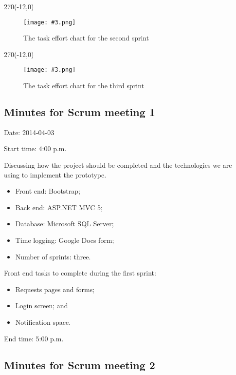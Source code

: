 \documentclass[a4paper,titlepage,12pt]{article}
\newcommand\figimg[4][\textwidth]{
	\begin{figure}
		\caption{#4}
		\label{fig:#2}
		\texttt{[image: \#3.png]}
	\end{figure}
}
\begin{document}
\begin{landscape}
	\quad %
	\thispagestyle{empty}
	\begin{textblock}{270}(-12,0)
		\figimg[270mm]{effort2}{effort2}
			{The task effort chart for the second sprint}
	\end{textblock}
\end{landscape}

\begin{landscape}
	\quad %
	\thispagestyle{empty}
	\begin{textblock}{270}(-12,0)
		\figimg[270mm]{effort3}{effort3}
			{The task effort chart for the third sprint}
	\end{textblock}
\end{landscape}

\subsection{Minutes for Scrum meeting 1}

Date: 2014-04-03

Start time: 4:00 p.m.

Discussing how the project should be completed and the technologies we are
using to implement the prototype.

\begin{itemize}
	\item Front end: Bootstrap;
	\item Back end: ASP.NET MVC 5;
	\item Database: Microsoft SQL Server;
	\item Time logging: Google Docs form;
	\item Number of sprints: three.
\end{itemize}

Front end tasks to complete during the first sprint:

\begin{itemize}
	\item Requests pages and forms;
	\item Login screen; and
	\item Notification space.
\end{itemize}

End time: 5:00 p.m.

\subsection{Minutes for Scrum meeting 2}
\end{document}
